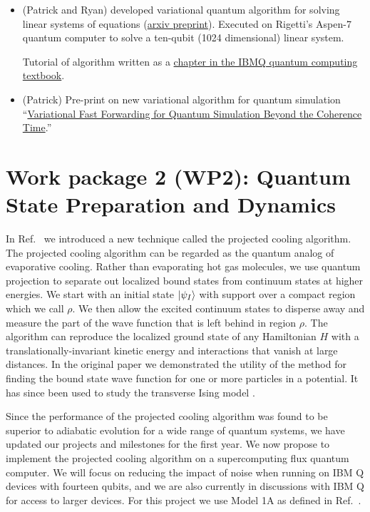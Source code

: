 \documentclass[11pt]{article}
\begin{document}
\begin{itemize}
    \item (Patrick and Ryan) developed variational quantum algorithm for solving linear systems of equations (\href{https://arxiv.org/abs/1909.05820}{arxiv preprint}).
        \subitem Executed on Rigetti's Aspen-7 quantum computer to solve a ten-qubit (1024 dimensional) linear system.
        
        \subitem Tutorial of algorithm written as a \href{https://qiskit.org/textbook/ch-paper-implementations/vqls.html}{chapter in the IBMQ quantum computing textbook}.
    
    \item (Patrick) Pre-print on new variational algorithm for quantum simulation ``\href{https://arxiv.org/abs/1910.04292}{Variational Fast Forwarding for Quantum Simulation Beyond the Coherence Time}.''
        
        \subitem 
\end{itemize}

\section{Work package 2 (WP2): Quantum State Preparation and Dynamics}


In Ref.~\cite{Lee:2019zze} we introduced a new technique called the projected cooling algorithm.  The projected cooling algorithm can be regarded as the quantum analog of evaporative cooling.  Rather than evaporating hot gas molecules, we use quantum projection to separate out localized bound states from continuum states at higher energies. We start with an initial state $\ket{\psi_I}$ with support over a compact region which we call $\rho$.  We then allow the excited continuum states to disperse away and measure the part of the wave function that is left behind in region $\rho$. The algorithm can reproduce the localized ground state of any Hamiltonian $H$ with a translationally-invariant kinetic energy and interactions that vanish at large distances.  In the original paper we demonstrated the utility of the method for finding the bound state wave function for one or more particles in a potential.  It has since been used to study the transverse Ising model \cite{Gustafson:2020vqg}. 

Since the performance of the projected cooling algorithm was found to be superior to adiabatic evolution for a wide range of quantum systems, we have updated our projects and milestones for the first year.  We now propose to implement the projected cooling algorithm on a supercomputing flux quantum computer.  We will focus on reducing the impact of noise when running on IBM Q devices with fourteen qubits, and we are also currently in discussions with IBM Q for access to larger devices. For this project we
use Model 1A as defined in Ref.~\cite{Lee:2019zze}.
\end{document}
